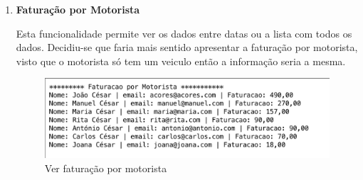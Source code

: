 \begin{enumerate}
\item\textbf{ Faturação por Motorista}

Esta funcionalidade permite ver os dados entre datas ou a lista com todos os dados. Decidiu-se que faria mais sentido apresentar a faturação por motorista, visto que o motorista só tem um veiculo então a informação seria a mesma. 

\begin{figure}[htpb]
	\centering
	\includegraphics[scale=0.5]{imagem/faturacaoPorMotorista}
	\caption{Ver faturação por motorista}
	\label{p3:fig:p3_faturacaoPorMotorista}
\end{figure}

	
\end{enumerate}

